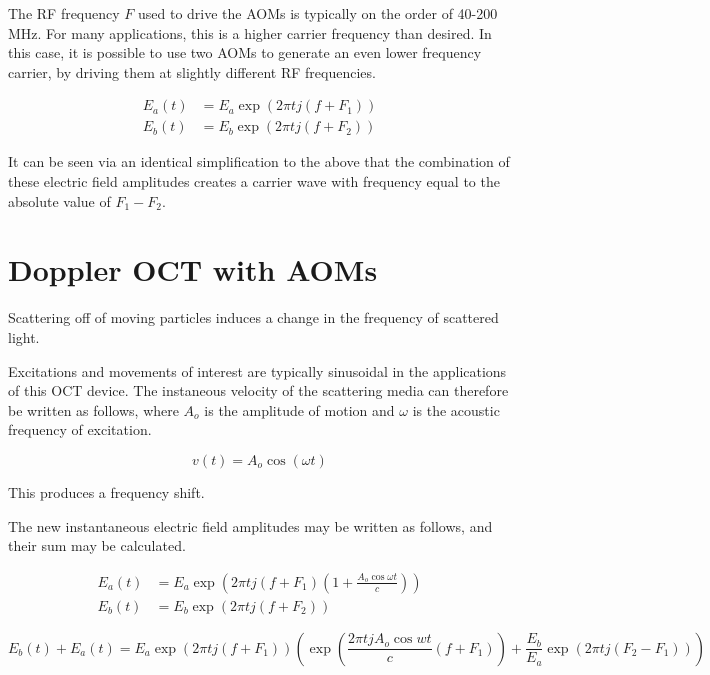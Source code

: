 The RF frequency $F$ used to drive the AOMs is typically on the order of 40-200 MHz. For many applications, this is a higher carrier frequency than desired. In this case, it is possible to use two AOMs to generate an even lower frequency carrier, by driving them at slightly different RF frequencies.

\begin{align}
E_a(t) & = E_a \exp{(2 \pi t j (f + F_1))} \\
E_b(t) & = E_b \exp{(2 \pi t j (f + F_2))}
\end{align}

It can be seen via an identical simplification to the above that the combination of these electric field amplitudes creates a carrier wave with frequency equal to the absolute value of $F_1 - F_2$.

\section{Doppler OCT with AOMs}
\label{sec:doppler_aom}

Scattering off of moving particles induces a change in the frequency of scattered light.


Excitations and movements of interest are typically sinusoidal in the applications of this OCT device. The instaneous velocity of the scattering media can therefore be written as follows, where $A_o$ is the amplitude of motion and $\omega$ is the acoustic frequency of excitation.

\begin{equation} \label{eq:media_v}
v(t) = A_o \cos{(\omega t)}
\end{equation}

This produces a frequency shift.


The new instantaneous electric field amplitudes may be written as follows, and their sum may be calculated.

\begin{align}
E_a(t) & = E_a \exp{(2 \pi t j (f + F_1)(1 + \frac{A_o\cos{\omega t}}{c}))} \\
E_b(t) & = E_b \exp{(2 \pi t j (f + F_2))}
\end{align}

\begin{dmath}
E_b(t) + E_a(t) = E_a \exp{(2 \pi t j (f + F_1))}\left(\exp{\left(\frac{2 \pi t j A_o \cos{wt}}{c}(f + F_1)\right)} + \frac{E_b}{E_a} \exp{(2 \pi t j (F_2 - F_1))}\right)
\end{dmath}


